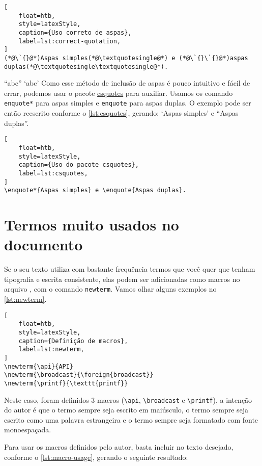 \begin{lstlisting}[
    float=htb, 
    style=latexStyle, 
    caption={Uso correto de aspas},
    label=lst:correct-quotation,
]
(*@\`{}@*)Aspas simples(*@\textquotesingle@*) e (*@\`{}\`{}@*)aspas duplas(*@\textquotesingle\textquotesingle@*).
\end{lstlisting}


\enquote{abc}
\enquote*{abc}
Como esse método de inclusão de aspas é pouco intuitivo e fácil de errar, podemos usar o pacote \href{https://ctan.org/pkg/csquotes}{csquotes} para auxiliar. Usamos os comando \texttt{enquote*} para aspas simples e \texttt{enquote} para aspas duplas.
O exemplo pode ser então reescrito conforme o \autoref{lst:csquotes}, gerando:
\enquote*{Aspas simples} e \enquote{Aspas duplas}.

\begin{lstlisting}[
    float=htb, 
    style=latexStyle, 
    caption={Uso do pacote csquotes},
    label=lst:csquotes,
]
\enquote*{Aspas simples} e \enquote{Aspas duplas}.
\end{lstlisting}

\section{Termos muito usados no documento}

Se o seu texto utiliza com bastante frequência termos que você quer que tenham tipografia e escrita consistente, elas podem ser adicionadas como macros no arquivo \macrofile, com o comando \texttt{newterm}. Vamos olhar alguns exemplos no \autoref{lst:newterm}.

\begin{lstlisting}[
    float=htb, 
    style=latexStyle, 
    caption={Definição de macros},
    label=lst:newterm,
]
\newterm{\api}{API}
\newterm{\broadcast}{\foreign{broadcast}}
\newterm{\printf}{\texttt{printf}}
\end{lstlisting}

Neste caso, foram definidos 3 macros (\texttt{\textbackslash api}, \texttt{\textbackslash broadcast} e \texttt{\textbackslash printf}), a intenção do autor é que o termo \api sempre seja escrito em maiúsculo, o termo \broadcast sempre seja escrito como uma palavra estrangeira e o termo \printf sempre seja formatado com fonte monoespaçada.

Para usar os macros definidos pelo autor, basta incluir no texto desejado, conforme o \autoref{lst:macro-usage}, gerando o seguinte resultado:


